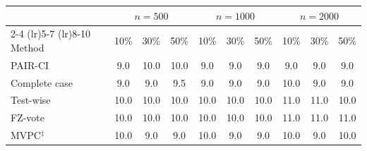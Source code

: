 \begin{tabular}{lccccccccc}
    \toprule
                  & \multicolumn{3}{c}{$n{=}500$} & \multicolumn{3}{c}{$n{=}1000$} & \multicolumn{3}{c}{$n{=}2000$} \\
    \cmidrule(lr){2-4} \cmidrule(lr){5-7} \cmidrule(lr){8-10}
    Method        & 10\% & 30\% & 50\%            & 10\%  & 30\%  & 50\%           & 10\%  & 30\%  & 50\%  \\
    \midrule
    PAIR-CI       &  9.0 & 10.0 & 10.0 &  9.0 &  9.0 &  9.0 &  9.0 &  9.0 &  9.0 \\
    Complete case &  9.0 &  9.0 &  9.5 &  9.0 &  9.0 &  9.0 & 10.0 &  9.0 &  9.0 \\
    Test-wise     & 10.0 & 10.0 & 10.0 & 10.0 & 10.0 & 10.0 & 11.0 & 11.0 & 10.0 \\
    FZ-vote       & 10.0 & 10.0 & 10.0 & 10.0 & 10.0 & 10.0 & 11.0 & 11.0 & 11.0 \\
    MVPC$^\ddagger$ & 10.0 &  9.0 &  9.0 & 10.0 &  9.0 &  9.0 & 10.0 &  9.0 & 10.0 \\
    \bottomrule
\end{tabular}
